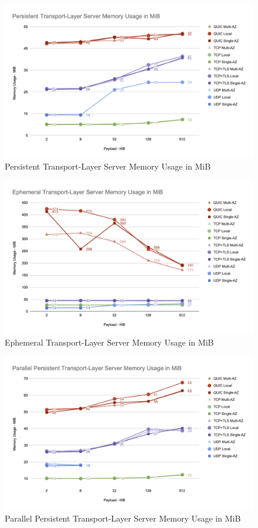 \begin{figure}[h!]
    \centering
    \includegraphics[width=\linewidth]{figures/charts/Persistent Transport-Layer Server Memory Usage in MiB.png}
    \caption{Persistent Transport-Layer Server Memory Usage in MiB}
    \label{fig:persistent_server_transport_memory}
\end{figure}

\begin{figure}[h!]
    \centering
    \includegraphics[width=\linewidth]{figures/charts/Ephemeral Transport-Layer Server Memory Usage in MiB.png}
    \caption{Ephemeral Transport-Layer Server Memory Usage in MiB}
    \label{fig:ephemeral_server_transport_memory}
\end{figure}

\begin{figure}[h!]
    \centering
    \includegraphics[width=\linewidth]{figures/charts/Parallel Persistent Transport-Layer Server Memory Usage in MiB.png}
    \caption{Parallel Persistent Transport-Layer Server Memory Usage in MiB}
    \label{fig:parallel_server_transport_memory}
\end{figure}
